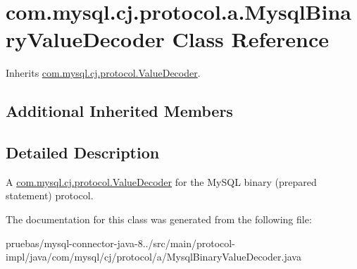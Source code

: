 \hypertarget{classcom_1_1mysql_1_1cj_1_1protocol_1_1a_1_1_mysql_binary_value_decoder}{}\section{com.\+mysql.\+cj.\+protocol.\+a.\+Mysql\+Binary\+Value\+Decoder Class Reference}
\label{classcom_1_1mysql_1_1cj_1_1protocol_1_1a_1_1_mysql_binary_value_decoder}


Inherits \mbox{\hyperlink{interfacecom_1_1mysql_1_1cj_1_1protocol_1_1_value_decoder}{com.\+mysql.\+cj.\+protocol.\+Value\+Decoder}}.

\subsection*{Additional Inherited Members}


\subsection{Detailed Description}
A \mbox{\hyperlink{interfacecom_1_1mysql_1_1cj_1_1protocol_1_1_value_decoder}{com.\+mysql.\+cj.\+protocol.\+Value\+Decoder}} for the My\+S\+QL binary (prepared statement) protocol. 

The documentation for this class was generated from the following file\+:\begin{DoxyCompactItemize}
\item 
pruebas/mysql-\/connector-\/java-\/8../src/main/protocol-\/impl/java/com/mysql/cj/protocol/a/Mysql\+Binary\+Value\+Decoder.\+java\end{DoxyCompactItemize}
